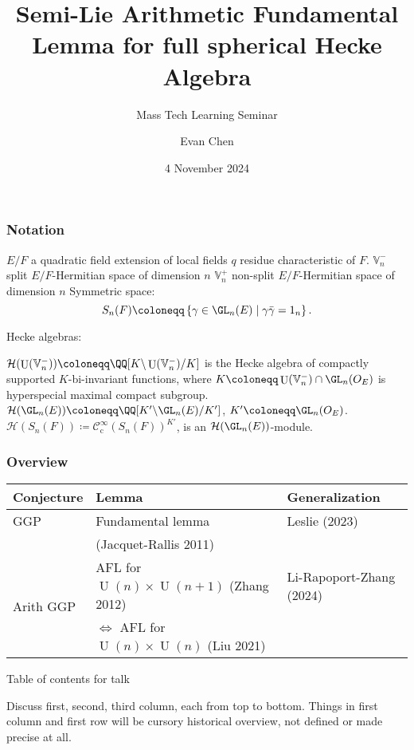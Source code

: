 \documentclass[11pt]{beamer}
\title[Semi-Lie AFL for Hecke]{Semi-Lie Arithmetic Fundamental Lemma for full spherical Hecke Algebra}
\subtitle{Mass Tech Learning Seminar}
\author{Evan Chen}
\date{4 November 2024}
\DeclareMathOperator{\U}{U}
\newcommand{\HH}{\mathcal{H}}
\newcommand{\VV}{\mathbb{V}}
\renewcommand{\OO}{O}
\begin{document}
\begin{frame}
  \maketitle
\end{frame}

\begin{frame}
  \frametitle{Notation}
  \begin{itemize}
  \ii $E/F$ a quadratic field extension of local fields
  \ii $q$ residue characteristic of $F$.
  \ii $\VV_n^-$ split $E/F$-Hermitian space of dimension $n$
  \ii $\VV_n^+$ non-split $E/F$-Hermitian space of dimension $n$
  \ii Symmetric space:
  \[ S_n(F) \coloneqq \left\{ \gamma \in \GL_n(E) \mid \gamma\bar\gamma = 1_n \right\} . \]
  \end{itemize}
  Hecke algebras:
  \begin{itemize}
  \ii $\HH(\U(\VV_n^-)) \coloneqq \QQ[K \backslash \U(\VV_n^-) \slash K]$
  is the Hecke algebra of compactly supported $K$-bi-invariant functions,
  where $K \coloneqq \U(\VV_n^-) \cap \GL_n(\OO_E)$ is hyperspecial maximal compact subgroup.
  \ii $\HH(\GL_n(E)) \coloneqq \QQ[K' \backslash \GL_n(E) \slash K']$, $K' \coloneqq \GL_n(\OO_E)$.
  \ii $\HH(S_n(F)) \coloneqq \mathcal C^\infty_{\text{c}} (S_n(F))^{K'}$,
  is an $\HH(\GL_n(E))$-module.
  \end{itemize}
\end{frame}


\begin{frame}
  \frametitle{Overview}
  \centering
  \begin{tabular}{lp{12em}p{8em}}
    \toprule
    \textbf{Conjecture} & \textbf{Lemma} & \textbf{Generalization} \\
    \midrule
    GGP & Fundamental lemma & Leslie (2023) \\ & (Jacquet-Rallis 2011) \\
    \midrule
    \multirow{2}{*}[-1em]{Arith GGP} & AFL for $\U(n) \times \U(n+1)$ (Zhang 2012) & Li-Rapoport-Zhang (2024) \\ \cline{2-3}
    & $\iff$ AFL for $\U(n) \times \U(n)$ (Liu 2021) & 🤔 \\
    \bottomrule
  \end{tabular}
  \begin{block}{Table of contents for talk}
    \begin{itemize}
    \ii Discuss first, second, third column, each from top to bottom.
    \ii Things in first column and first row will be cursory historical overview,
      not defined or made precise at all.
    \end{itemize}
  \end{block}
\end{frame}
\end{document}
